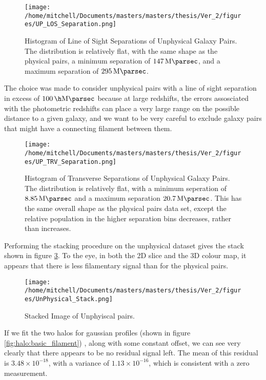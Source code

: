 \begin{figure}[H]
\centering
\texttt{[image: /home/mitchell/Documents/masters/masters/thesis/Ver\_2/figures/UP\_LOS\_Separation.png]}
\caption{Histogram of Line of Sight Separations of Unphysical Galaxy Pairs. The distribution is relatively flat, with the same shape as the physical pairs, a minimum separation of $\SI{147}{\mega\parsec}$, and a maximum separation of $\SI{295}{\mega\parsec}$.  }
\label{fig:unphysical:lineofsight}
\end{figure}

The choice was made to consider unphysical pairs with a line of sight separation in excess of $\SI{100}{\per\h\mega\parsec}$ because at large redshifts, the errors assosciated with the photometric redshifts can place a very large range on the possible distance to a given galaxy, and we want to be very careful to exclude galaxy pairs that might have a connecting filament between them. 

\begin{figure}[H]
\centering
\texttt{[image: /home/mitchell/Documents/masters/masters/thesis/Ver\_2/figures/UP\_TRV\_Separation.png]}
\caption{Histogram of Transverse Separations of Unphysical Galaxy Pairs. The distribution is relatively flat, with a minimum seperation of $\SI{8.85}{\mega\parsec}$ and a maximum separation $\SI{20.7}{\mega\parsec}$. This has the same overall shape as the physical pairs data set, except the relative population in the higher separation bins decreases, rather than increases.}
\label{fig:unphysical:transverse}
\end{figure}

Performing the stacking procedure on the unphysical dataset gives the stack shown in figure \ref{fig:unphysical:stack}. To the eye, in both the 2D slice and the 3D colour map, it appears that there is less filamentary signal than for the physical pairs. 

\begin{figure}[H]
\centering
\texttt{[image: /home/mitchell/Documents/masters/masters/thesis/Ver\_2/figures/UnPhysical\_Stack.png]}
\caption{Stacked Image of Unphyiscal pairs.}
\label{fig:unphysical:stack}
\end{figure}

If we fit the two halos for gaussian profiles (shown in figure \ref{fig:halo:basic_filament}) , along with some constant offset, we can see very clearly that there appears to be no residual signal left. The mean of this residual is $3.48 \times 10^{-18}$, with a variance of $1.13 \times 10^{-16}$, which is consistent with a zero measurement. 


